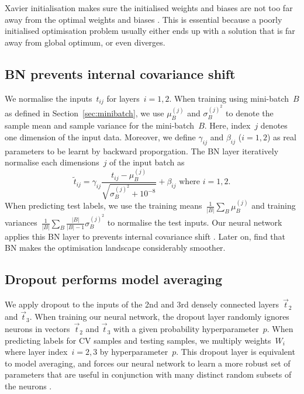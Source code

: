 Xavier initialisation makes sure the initialised weights and biases are not too far away from the optimal weights and biases \citep{pmlr-v9-glorot10a}. This is essential because a poorly initialised optimisation problem usually either ends up with a solution that is far away from global optimum, or even diverges.

\subsection{BN prevents internal covariance shift}
We normalise the inputs~$t_{ij}$ for layers~$i=1,2$. When training using mini-batch~$B$ as defined in Section~\ref{sec:minibatch}, we use $\mu_B^{(j)}$ and $\sigma_B^{(j)^2}$ to denote the sample mean and sample variance for the mini-batch~$B$. Here, index~$j$ denotes one dimension of the input data. Moreover, we define $\gamma_{ij}$ and $\beta_{ij}$ ($i=1,2$) as real parameters to be learnt by backward proporgation. The BN layer iteratively normalise each dimensions~$j$ of the input batch as
\begin{equation}
     {\tilde {t}}_{ij}=\gamma_{ij}\frac {{t}_{ij}-\mu _{B}^{(j)}}{\sqrt {\sigma _{B}^{(j)^{2}}+10^{-8} }}+\beta_{ij} \text{ where } i=1,2.
\end{equation}
When predicting test labels, we use the training means~$\frac{1}{\left|B\right|}\sum_B \mu_B^{(j)}$ and training  variances~$\frac{1}{\left|B\right|}\sum_B \frac{\left|B\right|}{\left|B\right|-1}\sigma_B^{(j)^2}$ to normalise the test inputs.
Our neural network applies this BN layer to prevents internal covariance shift \citep{pmlr-v37-ioffe15}. Later on, \citet{NIPS20187515} find that BN makes the optimisation landscape considerably smoother.

\subsection{Dropout performs model averaging}
We apply dropout to the inputs of the 2nd and 3rd densely connected layers~$\vec t_2$ and $\vec t_3$. 
When training our neural network, the dropout layer randomly ignores neurons in vectors~$\vec t_2$ and $\vec t_3$ with a given probability hyperparameter~$p$. 
When predicting labels for CV samples and testing samples, we multiply weights~$W_i$ where layer index~$i=2,3$ by hyperparameter~$p$. This dropout layer is equivalent to model averaging, and forces our neural network to learn a more robust set of parameters that are useful in conjunction with many distinct random subsets of the neurons \citep{DBLP:journals/corr/abs-1207-0580}.

